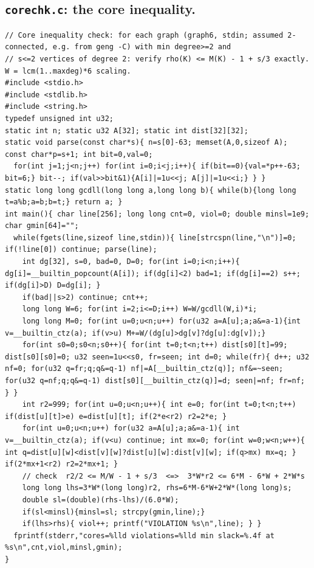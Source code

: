 \documentclass[11pt]{amsart}
\theoremstyle{definition}
\begin{document}
\subsection*{\texttt{corechk.c}: the core inequality.}
\begin{lstlisting}
// Core inequality check: for each graph (graph6, stdin; assumed 2-connected, e.g. from geng -C) with min degree>=2 and
// s<=2 vertices of degree 2: verify rho(K) <= M(K) - 1 + s/3 exactly. W = lcm(1..maxdeg)*6 scaling.
#include <stdio.h>
#include <stdlib.h>
#include <string.h>
typedef unsigned int u32;
static int n; static u32 A[32]; static int dist[32][32];
static void parse(const char*s){ n=s[0]-63; memset(A,0,sizeof A); const char*p=s+1; int bit=0,val=0;
  for(int j=1;j<n;j++) for(int i=0;i<j;i++){ if(bit==0){val=*p++-63; bit=6;} bit--; if(val>>bit&1){A[i]|=1u<<j; A[j]|=1u<<i;} } }
static long long gcdll(long long a,long long b){ while(b){long long t=a%b;a=b;b=t;} return a; }
int main(){ char line[256]; long long cnt=0, viol=0; double minsl=1e9; char gmin[64]="";
  while(fgets(line,sizeof line,stdin)){ line[strcspn(line,"\n")]=0; if(!line[0]) continue; parse(line);
    int dg[32], s=0, bad=0, D=0; for(int i=0;i<n;i++){ dg[i]=__builtin_popcount(A[i]); if(dg[i]<2) bad=1; if(dg[i]==2) s++; if(dg[i]>D) D=dg[i]; }
    if(bad||s>2) continue; cnt++;
    long long W=6; for(int i=2;i<=D;i++) W=W/gcdll(W,i)*i;
    long long M=0; for(int u=0;u<n;u++) for(u32 a=A[u];a;a&=a-1){int v=__builtin_ctz(a); if(v>u) M+=W/(dg[u]>dg[v]?dg[u]:dg[v]);}
    for(int s0=0;s0<n;s0++){ for(int t=0;t<n;t++) dist[s0][t]=99; dist[s0][s0]=0; u32 seen=1u<<s0, fr=seen; int d=0; while(fr){ d++; u32 nf=0; for(u32 q=fr;q;q&=q-1) nf|=A[__builtin_ctz(q)]; nf&=~seen; for(u32 q=nf;q;q&=q-1) dist[s0][__builtin_ctz(q)]=d; seen|=nf; fr=nf; } }
    int r2=999; for(int u=0;u<n;u++){ int e=0; for(int t=0;t<n;t++) if(dist[u][t]>e) e=dist[u][t]; if(2*e<r2) r2=2*e; }
    for(int u=0;u<n;u++) for(u32 a=A[u];a;a&=a-1){ int v=__builtin_ctz(a); if(v<u) continue; int mx=0; for(int w=0;w<n;w++){ int q=dist[u][w]<dist[v][w]?dist[u][w]:dist[v][w]; if(q>mx) mx=q; } if(2*mx+1<r2) r2=2*mx+1; }
    // check  r2/2 <= M/W - 1 + s/3  <=>  3*W*r2 <= 6*M - 6*W + 2*W*s
    long long lhs=3*W*(long long)r2, rhs=6*M-6*W+2*W*(long long)s;
    double sl=(double)(rhs-lhs)/(6.0*W);
    if(sl<minsl){minsl=sl; strcpy(gmin,line);}
    if(lhs>rhs){ viol++; printf("VIOLATION %s\n",line); } }
  fprintf(stderr,"cores=%lld violations=%lld min slack=%.4f at %s\n",cnt,viol,minsl,gmin);
}
\end{lstlisting}
\end{document}
